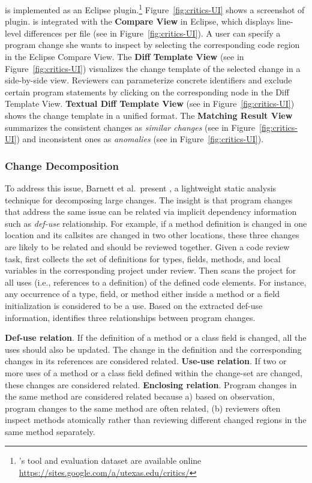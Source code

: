 \documentclass[runningheads,a4paper]{llncs}
\begin{document}
{\critics} is implemented as an Eclipse plugin.\footnote{{\critics}'s tool and evaluation dataset are available online \url{https://sites.google.com/a/utexas.edu/critics/}} Figure~\ref{fig:critics-UI} shows a screenshot of {\critics} plugin. {\critics} is integrated with the {\bf Compare View} in Eclipse, which displays line-level differences per file (see  in Figure~\ref{fig:critics-UI}). A user can specify a program change she wants to inspect by selecting the corresponding code region in the Eclipse Compare View. The {\bf Diff Template View} (see  in Figure~\ref{fig:critics-UI}) visualizes the change template of the selected change in a side-by-side view. Reviewers can parameterize concrete identifiers and exclude certain program statements by clicking on the corresponding node in the Diff Template View. {\bf Textual Diff Template View} (see  in Figure~\ref{fig:critics-UI}) shows the change template in a unified format. The {\bf Matching Result View} summarizes the consistent changes as {\em similar changes} (see  in Figure~\ref{fig:critics-UI}) and inconsistent ones as {\em anomalies} (see  in Figure~\ref{fig:critics-UI}).


\subsubsection{Change Decomposition}

To address this issue, Barnett et al.~present {\clusterchanges}, a lightweight static analysis technique for decomposing large changes. The insight is that program changes that address the same issue can be related via implicit dependency information such as {\em def-use} relationship. For example, if a method definition is changed in one location and its callsites are changed in two other locations, these three changes are likely to be related and should be reviewed together. Given a code review task, {\clusterchanges} first collects the set of definitions for types, fields, methods, and local variables in the corresponding project under review. Then {\clusterchanges} scans the project for all uses (i.e., references to a definition) of the defined code elements. For instance, any occurrence of a type, field, or method either inside a method or a field initialization is considered to be a use. Based on the extracted def-use information, {\clusterchanges} identifies three relationships between program changes. 

 {\bf Def-use relation}. If the definition of a method or a class field is changed, all the uses should also be updated. The change in the definition and the corresponding changes in its references are considered related.
 {\bf Use-use relation}. If two or more uses of a method or a class field defined within the change-set are changed, these changes are considered related. 
 {\bf Enclosing relation}. Program changes in the same method are considered related because a) based on observation, program changes to the same method are often related, (b) reviewers often inspect methods atomically rather than reviewing different changed regions in the same method separately.
\end{document}
